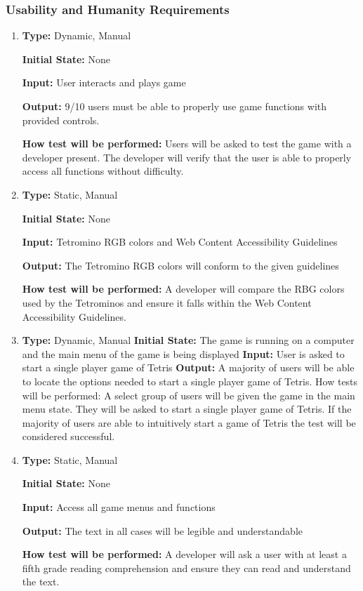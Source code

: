 \documentclass[12pt, titlepage]{article}
\begin{document}
	\subsubsection{Usability and Humanity Requirements}
	\begin{enumerate}
		\item
		\textbf{Type:} Dynamic, Manual
		
		\textbf{Initial State:} None
		
		\textbf{Input:} User interacts and plays game
		
		\textbf{Output:} 9/10 users must be able to properly use game functions with provided controls.
		
		\textbf{How test will be performed:} Users will be asked to test the game with a developer present. The developer will verify that the user is able to properly access all functions without difficulty.
		
		\item
		\textbf{Type:} Static, Manual
		
		\textbf{Initial State:} None
		
		\textbf{Input:} Tetromino RGB colors and Web Content Accessibility Guidelines
		
		\textbf{Output:} The Tetromino RGB colors will conform to the given guidelines
		
		\textbf{How test will be performed:} A developer will compare the RBG colors used by the Tetrominos and ensure it falls within the Web Content Accessibility Guidelines.
		
		\item
		\textbf{Type:} Dynamic, Manual
		\textbf{Initial State:} The game is running on a computer and the main menu of the game is being displayed
		\textbf{Input:} User is asked to start a single player game of Tetris
		\textbf{Output:} A majority of users will be able to locate the options needed to start a single player game of Tetris.
		How tests will be performed:  A select group of users will be given the game in the main menu state. They will be asked to start a single player game of Tetris. If the majority of users are able to intuitively start a game of Tetris the test will be considered successful.
		\item
		\textbf{Type:} Static, Manual
		
		\textbf{Initial State:} None
		
		\textbf{Input:} Access all game menus and functions 
		
		\textbf{Output:} The text in all cases will be legible and understandable
		
		\textbf{How test will be performed:} A developer will ask a user with at least a fifth grade reading comprehension and ensure they can read and understand the text.
	\end{enumerate}
	
\end{document}
